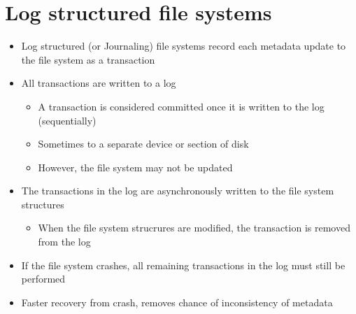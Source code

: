 \documentclass{article}[18pt]
\begin{document}
\section{Log structured file systems}
\begin{itemize}
	\item Log structured (or Journaling) file systems record each metadata update to the file system as a transaction
	\item All transactions are written to a log
	\begin{itemize}
		\item A transaction is considered committed once it is written to the log (sequentially)
		\item Sometimes to a separate device or section of disk
		\item However, the file system may not be updated
	\end{itemize}
	\item The transactions in the log are asynchronously written to the file system structures
	\begin{itemize}
		\item When the file system strucrures are modified, the transaction is removed from the log
	\end{itemize}
	\item If the file system crashes, all remaining transactions in the log must still be performed
	\item Faster recovery from crash, removes chance of inconsistency of metadata
\end{itemize}
\end{document}
